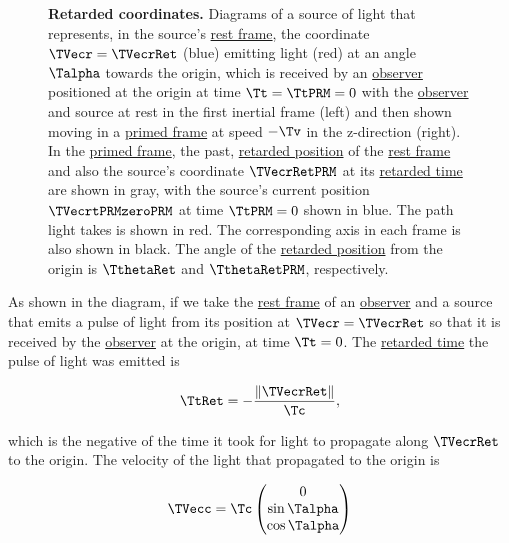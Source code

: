 \begin{figure}[ht]
	\caption{\textbf{Retarded coordinates.} Diagrams of a source of light that represents, in the source's \protect\hyperlink{def-proper-frame}{rest frame}, the coordinate ${\TVecr  } = {\TVecrRet  }$ (blue) emitting light (red) at an angle ${\Talpha }$ towards the origin, which is received by an \protect\hyperlink{def-observer}{observer} positioned at the origin at time ${\Tt } = \TtPRM  = 0$ with the \protect\hyperlink{def-observer}{observer} and source at rest in the first inertial frame (left) and then shown moving in a \protect\hyperlink{def-Primed-Frame}{primed frame} at speed $-{\Tv }$ in the z-direction (right). In the \protect\hyperlink{def-Primed-Frame}{primed frame}, the past, \protect\hyperlink{def-retarded-position}{retarded position} of the \protect\hyperlink{def-proper-frame}{rest frame} and also the source's coordinate ${\TVecrRetPRM  }$ at its \protect\hyperlink{def-retarded-time}{retarded time} are shown in gray, with the source's current position $\TVecrtPRMzeroPRM $ at time $\TtPRM =0$ shown in blue. The path light takes is shown in red. The corresponding axis in each frame is also shown in black. The angle of the \protect\hyperlink{def-retarded-position}{retarded position} from the origin is ${\TthetaRet  }$ and ${\TthetaRetPRM  }$, respectively.}
	\label{fig: Retarded field}
\end{figure}

As shown in the diagram, if we take the \hyperlink{def-proper-frame}{rest frame} of an \hyperlink{def-observer}{observer} and a source that emits a pulse of light from its position at ${\TVecr =\TVecrRet }$ so that it is received by the \hyperlink{def-observer}{observer} at the origin, at time ${\Tt } = 0$.
The \hyperlink{def-retarded-time}{retarded time} the pulse of light was emitted is

\begin{equation}
	{ \TtRet  } =-\frac{\|\TVecrRet \|}{\Tc },
\end{equation}

which is the negative of the time it took for light to propagate along ${\TVecrRet }$ to the origin.
The velocity of the light that propagated to the origin is

\begin{equation}
	\TVecc  = {\Tc }
	\begin{pmatrix}
		0            \\
		\sin{\Talpha } \\
		\cos{\Talpha } \\
	\end{pmatrix}
\end{equation}

